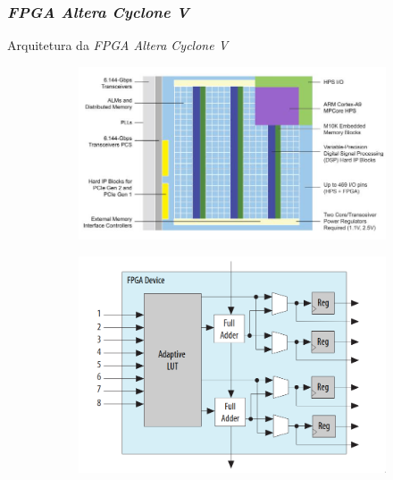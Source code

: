 \documentclass[aspectratio=169]{beamer}
\begin{document}
    \begin{frame}
        \frametitle{\textit{FPGA Altera Cyclone V}}
        \vfill
        \begin{block}{Arquitetura da \textit{FPGA Altera Cyclone V}}
        \begin{figure}[H]
            \begin{subfigure}
            \centering
                \includegraphics[width=.5\textwidth,height=.5\textheight,keepaspectratio]
                {../images/altera_cyclone_v_soc_architectural_downscale.jpg}
            \end{subfigure}
            \begin{subfigure}
            \centering
                \includegraphics[width=.4\textwidth,height=.5\textheight,keepaspectratio]
                {../images/intel_alm_high_level.png}
            \end{subfigure}
        \end{figure}
        \end{block}
        \vfill
    \end{frame}
\end{document}
